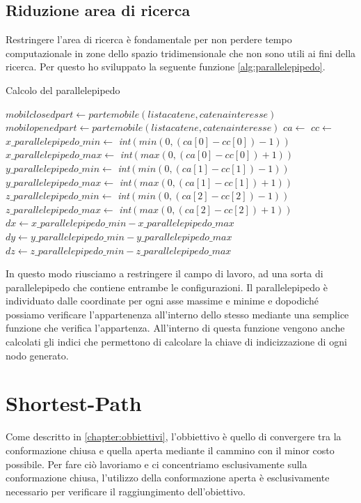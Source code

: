 \subsection{Riduzione area di ricerca}\label{subsec:areadiricerca}
Restringere l'area di ricerca è fondamentale per non perdere tempo computazionale in zone dello spazio tridimensionale che non sono utili ai fini della ricerca. Per questo ho sviluppato la seguente funzione \ref{alg:parallelepipedo}.
\begin{algorithm}
	\caption{Calcolo del parallelepipedo}
	\label{alg:parallelepipedo}
	\begin{algorithmic}
		\State $mobilclosedpart \gets partemobile(listacatene, catenainteresse)$
		\State $mobilopenedpart \gets partemobile(listacatene, catenainteresse)$
		\State $ca \gets$ 
		\State $cc \gets$ 
		\State $x\_parallelepipedo\_min \gets$ \textit{int}$(min(0,(ca[0]-cc[0])-1))$
		\State $x\_parallelepipedo\_max \gets$ \textit{int}$(max(0,(ca[0]-cc[0])+1))$
		\State $y\_parallelepipedo\_min \gets$ \textit{int}$(min(0,(ca[1]-cc[1])-1))$
		\State $y\_parallelepipedo\_max \gets$ \textit{int}$(max(0,(ca[1]-cc[1])+1))$
	    \State $z\_parallelepipedo\_min \gets$ \textit{int}$(min(0,(ca[2]-cc[2])-1))$
		\State $z\_parallelepipedo\_max \gets$ \textit{int}$(max(0,(ca[2]-cc[2])+1))$
		\State $dx \gets x\_parallelepipedo\_min - x\_parallelepipedo\_max$
		\State $dy \gets y\_parallelepipedo\_min - y\_parallelepipedo\_max$
		\State $dz \gets z\_parallelepipedo\_min - z\_parallelepipedo\_max$
		\EndProcedure
	\end{algorithmic}
\end{algorithm}
In questo modo riusciamo a restringere il campo di lavoro, ad una sorta di parallelepipedo che contiene entrambe le configurazioni. Il parallelepipedo è individuato dalle coordinate per ogni asse massime e minime e dopodiché possiamo verificare l'appartenenza all'interno dello stesso mediante una semplice funzione che verifica l'appartenza. All'interno di questa funzione vengono anche calcolati gli indici che permettono di calcolare la chiave di indicizzazione di ogni nodo generato.  

\section{Shortest-Path}\label{sec:shortestpath}
Come descritto in \ref{chapter:obbiettivi}, l'obbiettivo è quello di convergere tra la conformazione chiusa e quella aperta mediante il cammino con il minor costo possibile.
Per fare ciò lavoriamo e ci concentriamo esclusivamente sulla conformazione chiusa, l'utilizzo della conformazione aperta è esclusivamente necessario per verificare il raggiungimento dell'obiettivo. 

